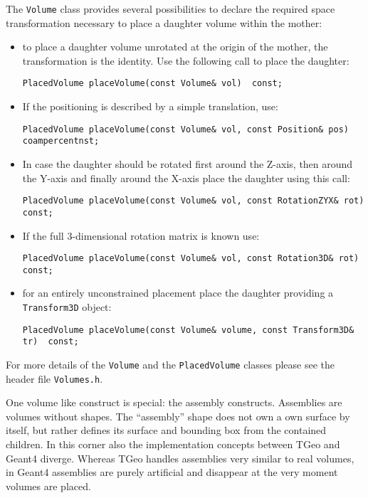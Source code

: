 The {\texttt{Volume}} class provides several possibilities to declare the required space transformation necessary to place a daughter volume  within the mother:
\begin{itemize}
\item to place a daughter volume unrotated at the origin of the mother, the 
transformation is the identity. Use the following call to place the daughter:
\begin{verbatim}
PlacedVolume placeVolume(const Volume& vol)  const;
\end{verbatim}
\item If the positioning is described by a simple translation, use:
\begin{verbatim}
PlacedVolume placeVolume(const Volume& vol, const Position& pos)  coampercentnst;
\end{verbatim}
\item In case the daughter should be rotated first around the Z-axis, then around the Y-axis and finally around the X-axis place the daughter using this call:
\begin{verbatim}
PlacedVolume placeVolume(const Volume& vol, const RotationZYX& rot)  const;
\end{verbatim}
\item If the full 3-dimensional rotation matrix is known use:
\begin{verbatim}
PlacedVolume placeVolume(const Volume& vol, const Rotation3D& rot)  const;
\end{verbatim}
\item for an entirely unconstrained placement place the daughter providing a \texttt{Transform3D} object:
\begin{verbatim}
PlacedVolume placeVolume(const Volume& volume, const Transform3D& tr)  const;
\end{verbatim}
\end{itemize}

For more details of the \texttt{Volume} and the \texttt{PlacedVolume} classes please see the header file \texttt{Volumes.h}.

One volume like construct is special: the assembly constructs. Assemblies are volumes without shapes. The ``assembly'' shape does not own a own surface by itself, but rather defines its surface and
bounding box from the contained children. In this corner also the implementation concepts between TGeo and Geant4 diverge. Whereas TGeo handles assemblies very similar to real volumes, in Geant4 assemblies are purely artificial and disappear at the very moment volumes  are placed.

